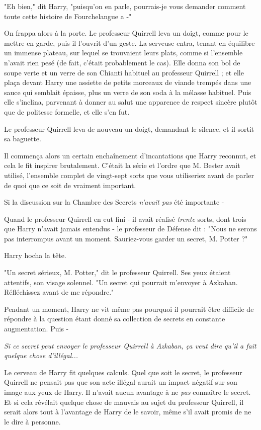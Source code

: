 "Eh bien," dit Harry, "puisqu'on en parle, pourrais-je vous demander comment toute cette histoire de Fourchelangue a -"

On frappa alors à la porte. Le professeur Quirrell leva un doigt, comme pour le mettre en garde, puis il l'ouvrit d'un geste. La serveuse entra, tenant en équilibre un immense plateau, sur lequel se trouvaient leurs plats, comme si l'ensemble n'avait rien pesé (de fait, c'était probablement le cas). Elle donna son bol de soupe verte et un verre de son Chianti habituel au professeur Quirrell ; et elle plaça devant Harry une assiette de petits morceaux de viande trempés dans une sauce qui semblait épaisse, plus un verre de son soda à la mélasse habituel. Puis elle s'inclina, parvenant à donner au salut une apparence de respect sincère plutôt que de politesse formelle, et elle s'en fut.

Le professeur Quirrell leva de nouveau un doigt, demandant le silence, et il sortit sa baguette.

Il commença alors un certain enchaînement d'incantations que Harry reconnut, et cela le fit inspirer brutalement. C'était la série et l'ordre que M. Bester avait utilisé, l'ensemble complet de vingt-sept sorts que vous utiliseriez avant de parler de quoi que ce soit de vraiment important.

Si la discussion sur la Chambre des Secrets \emph{n'avait pas}  été importante -

Quand le professeur Quirrell en eut fini - il avait réalisé \emph{trente}  sorts, dont trois que Harry n'avait jamais entendus - le professeur de Défense dit : "Nous ne serons pas interrompus avant un moment. Sauriez-vous garder un secret, M. Potter ?"

Harry hocha la tête.

"Un secret sérieux, M. Potter," dit le professeur Quirrell. Ses yeux étaient attentifs, son visage solennel. "Un secret qui pourrait m'envoyer à Azkaban. Réfléchissez avant de me répondre."

Pendant un moment, Harry ne vit même pas pourquoi il pourrait être difficile de répondre à la question étant donné sa collection de secrets en constante augmentation. Puis -

\emph{Si ce secret peut envoyer le professeur Quirrell à Azkaban, ça veut dire qu'il a fait quelque chose d'illégal...} 

Le cerveau de Harry fit quelques calculs. Quel que soit le secret, le professeur Quirrell ne pensait pas que son acte illégal aurait un impact négatif sur son image aux yeux de Harry. Il n'avait aucun avantage à ne \emph{pas}  connaître le secret. Et si cela révélait quelque chose de mauvais au sujet du professeur Quirrell, il serait alors tout à l'avantage de Harry de le savoir, même s'il avait promis de ne le dire à personne.

